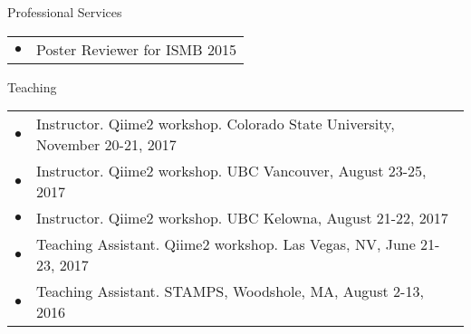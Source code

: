 \documentclass{resume} %
\begin{document}
\begin{rSection}{Professional Services}
  \begin{tabular}{ll}
    $\bullet$ & Poster Reviewer for ISMB 2015
  \end{tabular}
\end{rSection}

\begin{rSection}{Teaching}
  \begin{tabular}{ll}
    $\bullet$ & Instructor. Qiime2 workshop. Colorado State University, November 20-21, 2017 \\
    $\bullet$ & Instructor. Qiime2 workshop. UBC Vancouver, August 23-25, 2017 \\
    $\bullet$ & Instructor. Qiime2 workshop. UBC Kelowna, August 21-22, 2017 \\
    $\bullet$ & Teaching Assistant. Qiime2 workshop. Las Vegas, NV, June 21-23, 2017 \\
    $\bullet$ & Teaching Assistant. STAMPS, Woodshole, MA, August 2-13, 2016 \\
  \end{tabular}
\end{rSection}
\end{document}
